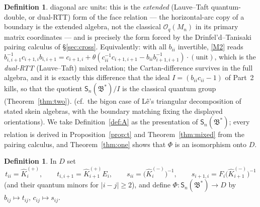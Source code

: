 \documentclass[11pt]{article}
\theoremstyle{definition}
\newtheorem{definition}[theorem]{Definition}
\theoremstyle{remark}
\newcommand{\B}{\mathfrak{B}}
\newcommand{\Sn}{\mathsf{S}_n}
\newcommand{\hK}{\hat K}
\newcommand{\tht}{\theta}
\begin{document}
\begin{definition}
diagonal arc units: this is the
\emph{extended} (Lauve--Taft quantum-double, or dual-RTT) form of
the face relation — the horizontal-arc copy of a boundary is the
extended algebra, not the classical $\mathcal O_q(M_n)$ in its
primary matrix coordinates — and is precisely the form forced by
the Drinfel'd--Tanisaki pairing calculus of \S\ref{sec:cross}.
Equivalently: with all $b_{ii}$ invertible, \eqref{M2} reads
$b_{i,i+1}^{-1}c_{i+1,i}b_{i,i+1}
=c_{i+1,i}+\tht(c_{ii}^{-1}c_{i+1,i+1}-b_{ii}b_{i+1,i+1}^{-1})
 \cdot(\text{unit})$,
which is the \emph{dual-RTT} (Lauve--Taft) mixed relation; the
Cartan-difference survives in the full algebra, and it is exactly
this difference that the ideal $I=(b_{ii}c_{ii}-1)$ of Part~2 kills,
so that the quotient $\Sn(\B^*)/I$ is the classical quantum group
(Theorem~\ref{thm:two}).  
(cf.\ the bigon case of L\^e's triangular decomposition of stated
skein algebras, with the boundary matching fixing the displayed
orientations).  We take Definition~\ref{def:A} as the presentation
of $\Sn(\B^*)$; every relation is derived in
Proposition~\ref{prop:t} and Theorem~\ref{thm:mixed} from the
pairing calculus, and Theorem~\ref{thm:one} shows that $\Phi$ is an
isomorphism onto $D$.
\end{definition}

\begin{definition}\label{def:phi}
In $D$ set
\begin{equation}
t_{ii}=\hK_i^{(+)},\qquad
t_{i,i+1}=\hK_{i+1}^{(+)}E_i,\qquad
s_{ii}=\bigl(\hK_i^{(-)}\bigr)^{-1},\qquad
s_{i+1,i}=F_i\bigl(\hK_{i+1}^{(-)}\bigr)^{-1}
\label{arcimg}\tag{arc-img}
\end{equation}
(and their quantum minors for $|i-j|\ge2$), and define
$\Phi:\Sn(\B^*)\to D$ by $b_{ij}\mapsto t_{ij}$,
$c_{ij}\mapsto s_{ij}$.
\end{definition}
\end{document}
